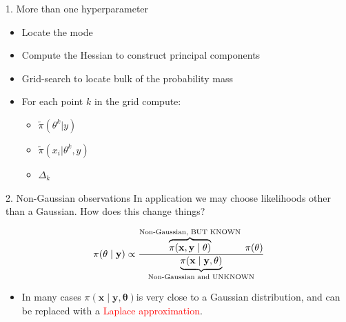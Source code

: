 \documentclass[
  ignorenonframetext,
]{beamer}
\providecommand{\tightlist}{%
  \setlength{\itemsep}{0pt}\setlength{\parskip}{0pt}}
\begin{document}
\begin{frame}{1. More than one hyperparameter}
\protect\hypertarget{more-than-one-hyperparameter-3}{}
\begin{itemize}
\item
  Locate the mode
\item
  Compute the Hessian to construct principal components
\item
  Grid-search to locate bulk of the probability mass
\item
  For each point \(k\) in the grid compute:

  \begin{itemize}
  \tightlist
  \item
    \(\widetilde{\pi}(\theta^k|y)\)
  \item
    \(\widetilde{\pi}(x_i|\theta^k,y)\)
  \item
    \(\Delta_k\)
  \end{itemize}
\end{itemize}
\end{frame}

\begin{frame}{2. Non-Gaussian observations}
\protect\hypertarget{non-gaussian-observations}{}
In application we may choose likelihoods other than a Gaussian. How does
this change things?

\[
\pi(\bf{\theta} \mid \bf{y}) \propto \frac{
            \overbrace{\pi(\bf{x}, \bf{y}\mid \bf{\theta})}^{\text{Non-Gaussian, BUT KNOWN}}
        \; \pi(\bf{\theta})}{\underbrace{\pi(\bf{x} \mid \bf{y},
            \bf{\theta})}_{\text{Non-Gaussian and UNKNOWN}}}
\]

\begin{itemize}
\tightlist
\item
  In many cases
  \(\pi(\boldsymbol{x} \mid \boldsymbol{y}, \boldsymbol{\theta})\)is
  very close to a Gaussian distribution, and can be replaced with a
  \textcolor{red}{Laplace approximation}.
\end{itemize}
\end{frame}
\end{document}
